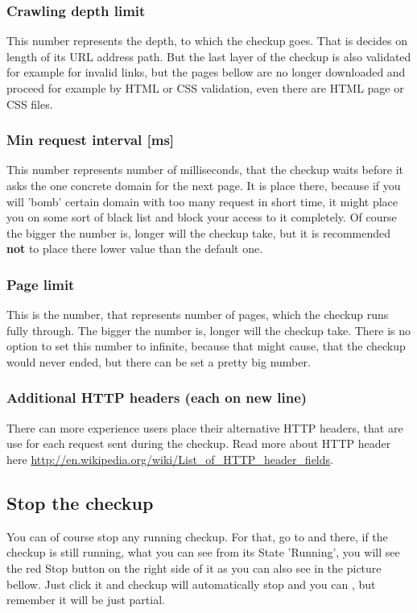 \documentclass[12pt,a4paper]{article}
\begin{document}
\subsubsection{Crawling depth limit}
This number represents the depth, to which the checkup goes. That is decides on length of its URL address path. But the last layer of the checkup is also validated for example for invalid links, but the pages bellow are no longer downloaded and proceed for example by HTML or CSS validation, even there are HTML page or CSS files.

\subsubsection{Min request interval [ms]}
This number represents number of milliseconds, that the checkup waits before it asks the one concrete domain for the next page. It is place there, because if you will 'bomb' certain domain with too many request in short time, it might place you on some sort of black list and block your access to it completely. Of course the bigger the number is, longer will the checkup take, but it is recommended \textbf{not} to place there lower value than the default one.

\subsubsection{Page limit}
This is the number, that represents number of pages, which the checkup runs fully through. The bigger the number is, longer will the checkup take. There is no option to set this number to infinite, because that might cause, that the checkup would never ended, but there can be set a pretty big number.

\subsubsection{Additional HTTP headers (each on new line)}
There can more experience users place their alternative HTTP headers, that are use for each request sent during the checkup. Read more about HTTP header here \url{http://en.wikipedia.org/wiki/List_of_HTTP_header_fields}.

\subsection{Stop the checkup}
You can of course stop any running checkup. For that, go to  and there, if the checkup is still running, what you can see from its State 'Running', you will see the red Stop button on the right side of it as you can also see in the picture bellow. Just click it and checkup will automatically stop and you can , but remember it will be just partial.
\end{document}
